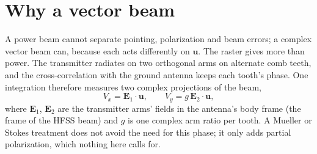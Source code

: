 \documentclass{aastex631}
\newcommand{\vu}{\mathbf{u}}
\newcommand{\vE}{\mathbf{E}}
\begin{document}
\section{Why a vector beam} \label{sec:why}
A power beam cannot separate pointing, polarization and beam errors; a complex vector beam can, because each
acts differently on $\vu$. The raster gives more than power. The transmitter radiates on two orthogonal arms on
alternate comb teeth, and the cross-correlation with the ground antenna keeps each tooth's phase. One integration
therefore measures two complex projections of the beam,
\begin{equation}
V_x = \vE_1\cdot\vu, \qquad V_y = g\,\vE_2\cdot\vu, \label{eq:model}
\end{equation}
where $\vE_1$, $\vE_2$ are the transmitter arms' fields in the antenna's body frame (the frame of the HFSS beam)
and $g$ is one complex arm ratio per tooth. A Mueller or Stokes treatment does not avoid the need for this phase;
it only adds partial polarization, which nothing here calls for.
\end{document}
